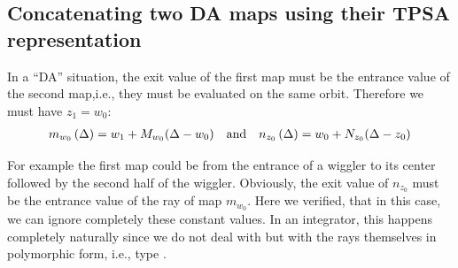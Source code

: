 \documentclass{hitec}     %
\begin{document}
{{{{\subsection{Concatenating two DA maps using their TPSA representation}\label{s:concatda}

In a ``DA'' situation, the exit value of the first map must be the entrance value of the second map,i.e., they must be evaluated on the same orbit. Therefore we must have  ${z}_{1}={w}_{0}$:
%
\begin{align} {m}_{{w}_{0}}\left({\Delta }\right)={w}_{1}+{M}_{{w}_{0}}(\Delta -{w}_{0})~~~{\rm a}{\rm n}{\rm d} ~~~{n}_{{z}_{0}}\left({\Delta }\right)={w}_{0}+{N}_{{z}_{0}}(\Delta -{z}_{0}) \label{eq:dadatpsa} \end{align}

For example the first map could be from the entrance of a wiggler to its center followed by the second half of the wiggler. Obviously, the exit value of ${n}_{{z}_{0}}$ must be the entrance value of the ray of map  ${m}_{{w}_{0}}$.  Here we verified, that in this case, we can ignore completely these constant values. In an integrator, this happens completely naturally since we do not deal with  but with the rays themselves in polymorphic form, i.e., type . 

}}}}
\end{document}
